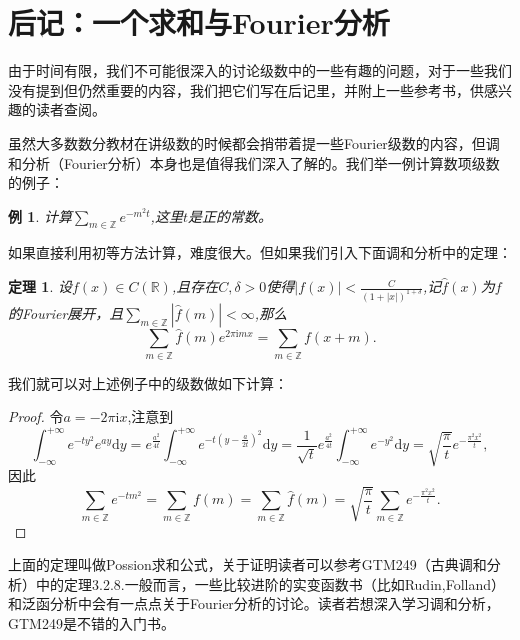 \documentclass{article}
\newtheorem{theorem}{定理}[subsection]
\newtheorem{example}{例}[subsection]
\begin{document}
\section*{后记：一个求和与Fourier分析}
由于时间有限，我们不可能很深入的讨论级数中的一些有趣的问题，对于一些我们没有提到但仍然重要的内容，我们把它们写在后记里，并附上一些参考书，供感兴趣的读者查阅。\par
虽然大多数数分教材在讲级数的时候都会捎带着提一些Fourier级数的内容，但调和分析（Fourier分析）本身也是值得我们深入了解的。我们举一例计算数项级数的例子：
\begin{example}
计算$\sum_{m\in\mathbb{Z}}e^{-m^2t}$,这里$t$是正的常数。
\end{example}
如果直接利用初等方法计算，难度很大。但如果我们引入下面调和分析中的定理：
\begin{theorem}
设$f(x)\in C(\mathbb{R})$,且存在$C,\delta>0$使得$|f(x)|<\frac{C}{(1+|x|)^{1+\delta}}$,记$\widehat{f}(x)$为$f$的Fourier展开，且$\sum_{m\in\mathbb{Z}}|\widehat{f}(m)|<\infty$,那么
$$
\sum_{m\in \mathbb{Z}}{\widehat{f}\left( m \right) e^{2\pi \mathrm{i}mx}}=\sum_{m\in \mathbb{Z}}{f\left( x+m \right)}.
$$
\end{theorem}
我们就可以对上述例子中的级数做如下计算：
\begin{proof}
令$a=-2\pi\mathrm{i}x$,注意到
$$
\int_{-\infty}^{+\infty}{e^{-ty^2}e^{ay}\mathrm{d}y}=e^{\frac{a^2}{4t}}\int_{-\infty}^{+\infty}{e^{-t\left( y-\frac{a}{2t} \right) ^2}\mathrm{d}y}=\frac{1}{\sqrt{t}}e^{\frac{a^2}{4t}}\int_{-\infty}^{+\infty}{e^{-y^2}\mathrm{d}y}=\sqrt{\frac{\pi}{t}}e^{-\frac{\pi ^2x^2}{t}},
$$
因此
$$
\sum_{m\in \mathbb{Z}}{e^{-tm^2}}=\sum_{m\in \mathbb{Z}}{f\left( m \right)}=\sum_{m\in \mathbb{Z}}{\widehat{f}\left( m \right)}=\sqrt{\frac{\pi}{t}}\sum_{m\in \mathbb{Z}}{e^{-\frac{\pi ^2x^2}{t}}}.
$$
\end{proof}
上面的定理叫做Possion求和公式，关于证明读者可以参考GTM249（古典调和分析）中的定理3.2.8.一般而言，一些比较进阶的实变函数书（比如Rudin,Folland）和泛函分析中会有一点点关于Fourier分析的讨论。读者若想深入学习调和分析，GTM249是不错的入门书。
\newpage
\end{document}
